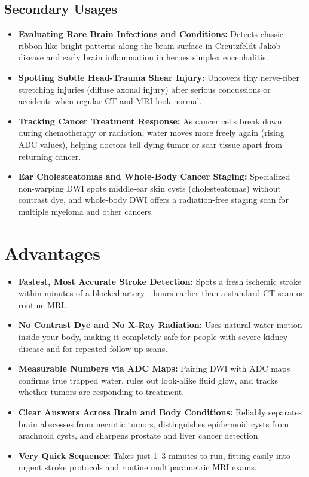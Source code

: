 \subsection{Secondary Usages}
\begin{itemize}
\item \textbf{Evaluating Rare Brain Infections and Conditions:} Detects classic ribbon-like bright patterns along the brain surface in Creutzfeldt-Jakob disease and early brain inflammation in herpes simplex encephalitis.
\item \textbf{Spotting Subtle Head-Trauma Shear Injury:} Uncovers tiny nerve-fiber stretching injuries (diffuse axonal injury) after serious concussions or accidents when regular CT and MRI look normal.
\item \textbf{Tracking Cancer Treatment Response:} As cancer cells break down during chemotherapy or radiation, water moves more freely again (rising ADC values), helping doctors tell dying tumor or scar tissue apart from returning cancer.
\item \textbf{Ear Cholesteatomas and Whole-Body Cancer Staging:} Specialized non-warping DWI spots middle-ear skin cysts (cholesteatomas) without contrast dye, and whole-body DWI offers a radiation-free staging scan for multiple myeloma and other cancers.
\end{itemize}

\section{Advantages}
\begin{itemize}
\item \textbf{Fastest, Most Accurate Stroke Detection:} Spots a fresh ischemic stroke within minutes of a blocked artery---hours earlier than a standard CT scan or routine MRI.
\item \textbf{No Contrast Dye and No X-Ray Radiation:} Uses natural water motion inside your body, making it completely safe for people with severe kidney disease and for repeated follow-up scans.
\item \textbf{Measurable Numbers via ADC Maps:} Pairing DWI with ADC maps confirms true trapped water, rules out look-alike fluid glow, and tracks whether tumors are responding to treatment.
\item \textbf{Clear Answers Across Brain and Body Conditions:} Reliably separates brain abscesses from necrotic tumors, distinguishes epidermoid cysts from arachnoid cysts, and sharpens prostate and liver cancer detection.
\item \textbf{Very Quick Sequence:} Takes just 1--3 minutes to run, fitting easily into urgent stroke protocols and routine multiparametric MRI exams.
\end{itemize}

